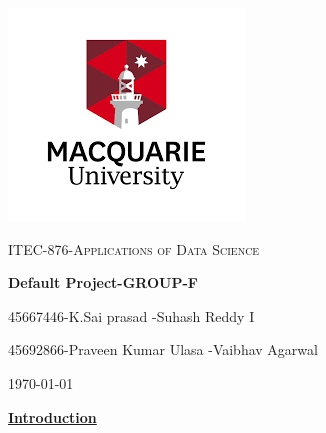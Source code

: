 \documentclass[a4paper,1pt]{article}
\begin{document}
	
	
	\begin{titlepage}
		
		\centering
		\includegraphics{mac-download.png}\\[1cm] %
	
		{\scshape\LARGE ITEC-876-Applications of Data Science \par}
		\vspace{1cm}
		
		{\Large \textbf{Default Project-GROUP-F}\par}
		\vspace{1cm}
		{\Large 45667446-K.Sai prasad  \space\space\space\space\space\space{}-Suhash Reddy I \par}
		\vspace{1cm}
			{\Large 45692866-Praveen Kumar Ulasa \space\space\space\space\space\space{}-Vaibhav Agarwal \par}
		\date{}
		
		\vfill
		\date{}
		{\large \today\par}
	\end{titlepage}
	
	
	
	\date{}
	
	
		
\setlength{\droptitle}{-14em}\bigskip





\begin{center}
	\textbf{\underline {Introduction}}
\end{center}
\end{document}
